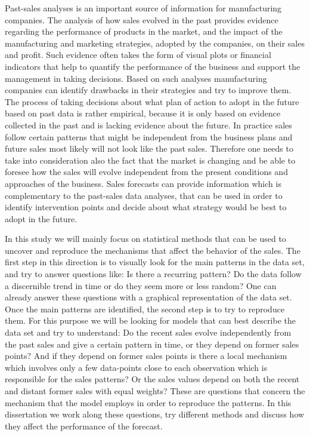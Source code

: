 \documentclass[12pt, letterpaper]{article}\usepackage[]{graphicx}\usepackage[]{color}
\begin{document}
Past-sales analyses is an important source of information for manufacturing companies. The analysis of how sales evolved in the past provides evidence regarding the performance of products in the market, and the impact of the manufacturing and marketing strategies, adopted by the companies, on their sales and profit. Such evidence often takes the form of visual plots or financial indicators that help to quantify the performance of the business and support the management in taking decisions. Based on such analyses manufacturing companies can identify drawbacks in their strategies and try to improve them. The process of taking decisions about what plan of action to adopt in the future based on past data is rather empirical, because it is only based on evidence collected in the past and is lacking evidence about the future. In practice sales follow certain patterns that might be independent from the business plans and future sales most likely will not look like the past sales. Therefore one needs to take into consideration also the fact that the market is changing and be able to foresee how the sales will evolve independent from the present conditions and approaches of the business. Sales forecasts can provide information which is complementary to the past-sales data analyses, that can be used in order to identify intervention points and decide about what strategy would be best to adopt in the future.

In this study we will mainly focus on statistical methods that can be used to uncover and reproduce the mechanisms that affect the behavior of the sales. The first step in this direction is to visually look for the main patterns in the data set, and try to answer questions like: Is there a recurring pattern? Do the data follow a discernible trend in time or do they seem more or less random? One can already answer these questions with a graphical representation of the data set. Once the main patterns are identified, the second step is to try to reproduce them. For this purpose we will be looking for models that can best describe the data set and try to understand: Do the recent sales evolve independently from the past sales and give a certain pattern in time, or they depend on former sales points? And if they depend on former sales points is there a local mechanism which involves only a few data-points close to each observation which is responsible for the sales patterns? Or the sales values depend on both the recent and distant former sales with equal weights? These are questions that concern the mechanism that the model employs in order to reproduce the patterns. In this dissertation we work along these questions, try different methods and discuss how they affect the performance of the forecast.
\end{document}
